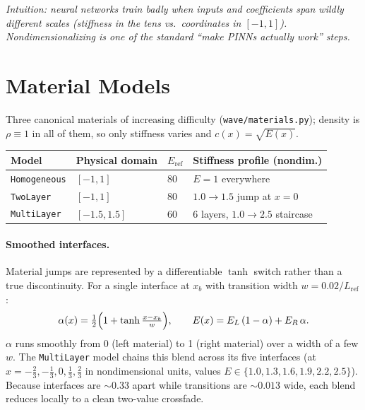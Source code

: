 \documentclass[11pt,a4paper]{article}
\newcommand{\intuition}[1]{\par\smallskip\noindent\textit{\color{inkgray}Intuition: #1}\par\smallskip}
\begin{document}
\intuition{neural networks train badly when inputs and coefficients span wildly
different scales (stiffness in the tens vs.\ coordinates in $[-1,1]$).
Nondimensionalizing is one of the standard ``make PINNs actually work'' steps.}

\section{Material Models}

Three canonical materials of increasing difficulty (\texttt{wave/materials.py});
density is $\rho \equiv 1$ in all of them, so only stiffness varies and
$c(x) = \sqrt{E(x)}$.

\begin{center}
\begin{tabular}{@{}llll@{}}
\toprule
Model & Physical domain & $E_{\mathrm{ref}}$ & Stiffness profile (nondim.) \\
\midrule
\texttt{Homogeneous} & $[-1,1]$   & 80 & $E = 1$ everywhere \\
\texttt{TwoLayer}    & $[-1,1]$   & 80 & $1.0 \to 1.5$ jump at $x=0$ \\
\texttt{MultiLayer}  & $[-1.5,1.5]$ & 60 & 6 layers, $1.0 \to 2.5$ staircase \\
\bottomrule
\end{tabular}
\end{center}

\paragraph{Smoothed interfaces.}
Material jumps are represented by a differentiable $\tanh$ switch rather than a
true discontinuity. For a single interface at $x_b$ with transition width
$w = 0.02/L_{\mathrm{ref}}$:
\begin{equation}
  \alpha(x) = \tfrac{1}{2}\Bigl(1 + \tanh\tfrac{x - x_b}{w}\Bigr), \qquad
  E(x) = E_L\,(1-\alpha) + E_R\,\alpha .
  \label{eq:tanh}
\end{equation}
$\alpha$ runs smoothly from 0 (left material) to 1 (right material) over a
width of a few $w$. The \texttt{MultiLayer} model chains this blend across its
five interfaces (at $x = -\tfrac{2}{3}, -\tfrac{1}{3}, 0, \tfrac{1}{3}, \tfrac{2}{3}$
in nondimensional units, values $E \in \{1.0, 1.3, 1.6, 1.9, 2.2, 2.5\}$).
Because interfaces are $\sim 0.33$ apart while transitions are $\sim 0.013$
wide, each blend reduces locally to a clean two-value crossfade.
\end{document}
